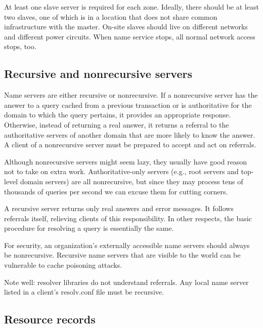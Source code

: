 At least one slave server is required for each zone. Ideally, there
should be at least two slaves, one of which is in a location that does
not share common infrastructure with the master. On-site slaves should
live on different networks and different power circuits. When name
service stops, all normal network access stops, too.


\subsection{Recursive and nonrecursive servers}

Name servers are either recursive or nonrecursive. If a nonrecursive server
has the answer to a query cached from a previous transaction or is
authoritative for the domain to which the query pertains, it provides an
appropriate response. Otherwise, instead of returning a real answer, it
returns a referral to the authoritative servers of another domain that
are more likely to know the answer. A client of a nonrecursive server
must be prepared to accept and act on referrals.

Although nonrecursive servers might seem lazy, they usually have good
reason not to take
\protect\hypertarget{part0024_split_013.htmlux5cux23_idIndexMarker2031}{}{}on
extra work. Authoritative-only servers (e.g.,
\protect\hypertarget{part0024_split_013.htmlux5cux23_idIndexMarker2032}{}{}root
servers and top-level domain servers) are all nonrecursive, but since
they may process tens of thousands of queries per second we can excuse
them for cutting corners.

A recursive server returns only real answers and error messages. It
follows referrals itself, relieving clients of this responsibility. In
other respects, the basic procedure for resolving a query is essentially
the same.

For security, an organization's externally accessible name servers
should always be nonrecursive. Recursive name servers that are visible
to the world can be vulnerable to cache poisoning attacks.

Note well: resolver libraries {do not} understand referrals. Any local
name server listed in a client's {resolv.conf} file must be recursive.

\protect\hypertarget{part0024_split_014.html}{}{}

\hypertarget{part0024_split_014.htmlux5cux23_idContainer1069}{}
\hypertarget{part0024_split_014.htmlux5cux23calibre_pb_13}{%
\subsection[Resource
records]{\texorpdfstring{\protect\hypertarget{part0024_split_014.htmlux5cux23_idTextAnchor858}{}{}\protect\hypertarget{part0024_split_014.htmlux5cux23_idIndexMarker2033}{}{}Resource
records}{Resource records}}\label{part0024_split_014.htmlux5cux23calibre_pb_13}}

